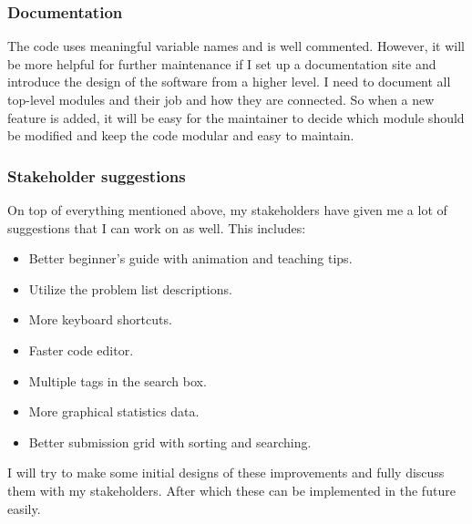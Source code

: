 \documentclass[report.tex]{subfiles}
\begin{document}
\subsubsection{Documentation}

The code uses meaningful variable names and is well commented. However, it will be more helpful for further maintenance if I set up a documentation site and introduce the design of the software from a higher level. I need to document all top-level modules and their job and how they are connected. So when a new feature is added, it will be easy for the maintainer to decide which module should be modified and keep the code modular and easy to maintain.

\subsubsection{Stakeholder suggestions}

On top of everything mentioned above, my stakeholders have given me a lot of suggestions that I can work on as well. This includes:

\begin{itemize}
  \item Better beginner's guide with animation and teaching tips.
  \item Utilize the problem list descriptions.
  \item More keyboard shortcuts.
  \item Faster code editor.
  \item Multiple tags in the search box.
  \item More graphical statistics data.
  \item Better submission grid with sorting and searching.
\end{itemize}

I will try to make some initial designs of these improvements and fully discuss them with my stakeholders. After which these can be implemented in the future easily.
\end{document}
